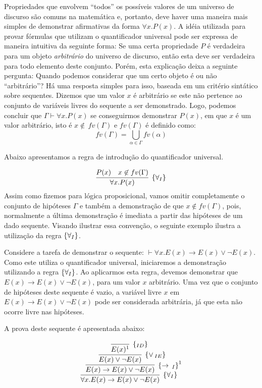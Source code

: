 Propriedades que envolvem ``todos'' os possíveis valores de um
universo de discurso são comuns na matemática e, portanto, deve haver
uma maneira mais simples de demonstrar afirmativas da forma $\forall
x.P(x)$. A idéia utilizada para provar fórmulas que utilizam o
quantificador universal pode ser expressa de maneira intuitiva da
seguinte forma: Se uma certa propriedade $P$ é verdadeira para um
objeto \emph{arbitrário} do universo de discurso, então esta deve ser
verdadeira para todo elemento deste conjunto. Porém, esta explicação
deixa a seguinte pergunta: Quando podemos considerar que um certo
objeto é ou não ``arbitrário''? Há uma resposta simples para isso,
baseada em um critério sintático sobre sequentes. Dizemos que um valor
$x$ é arbitrário se este não pertence ao conjunto de variáveis livres
do sequente a ser demonstrado. Logo, podemos concluir que
$\Gamma \vdash \forall x. P(x)$ se conseguirmos demonstrar $P(x)$, em
que $x$ é um valor arbitrário, isto é $x\not\in\,fv(\Gamma)$ e $fv(\Gamma)$ é definido como:
\[fv(\Gamma) = \bigcup_{\alpha\in\Gamma}fv(\alpha)\]

Abaixo apresentamos a regra de introdução do quantificador universal.

\[
\infer[\forallI]{\forall x. P(x)}
                      {P(x) & x \not\in fv(\Gamma)}
\]
Assim como fizemos para lógica proposicional, vamos omitir
completamente o conjunto de hipóteses $\Gamma$ e também a demonstração
de que $x\not\in fv(\Gamma)$, pois, normalmente a última demonstração
é imediata a partir das hipóteses de um dado sequente. Visando
ilustrar essa convenção, o seguinte exemplo ilustra a utilização da
regra $\scriptsize{\{\forall_I}\}$.
\begin{Example}
Considere a tarefa de demonstrar o sequente:
$\vdash \forall x. E(x) \to E(x) \lor \neg E(x)$. Como este utiliza o
quantificador universal, iniciaremos a demonstração utilizando a regra
$\scriptsize{\{\forall_I}\}$. Ao aplicarmos esta regra, devemos demonstrar que $E(x) \to
E(x) \lor \neg E(x)$, para um valor $x$ arbitrário. Uma vez que o
conjunto de hipóteses deste sequente é vazio, a variável livre $x$ em
$E(x) \to E(x) \lor \neg E(x)$ pode ser considerada arbitrária, já que
esta não ocorre livre nas hipóteses.

A prova deste sequente é apresentada abaixo:

\[
\infer[\forallI]{\forall
x. E(x) \to E(x) \lor \neg E(x)}
        {
          \infer[\impI^1]{E(x) \to E(x) \lor \neg E(x)}
                             {
                               \infer[\orIE]{E(x) \lor \neg E(x)}
                                         {
                                           \infer[\Id]{E(x)^1}{}}
                             }}
\]
\end{Example}

